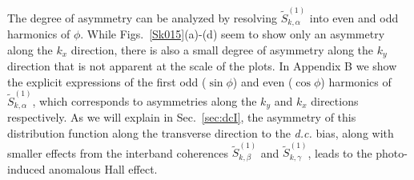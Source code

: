 \documentclass[reprint,amsmath,amssymb,aps,prb]{revtex4-1}
\begin{document}
The degree of asymmetry can be analyzed by resolving $\tilde{S}_{k,\alpha}^{(1)}$ into even and odd harmonics of $\phi$. 
While Figs.~\ref{Sk015}(a)-(d) seem to show only an asymmetry along the $k_x$  direction, there is also a small degree of asymmetry along the $k_y$ direction that is not apparent at the scale of the plots. In Appendix B we show the explicit expressions of the first odd ($\sin\phi$) and even ($\cos\phi$) harmonics of $\tilde{S}_{k,\alpha}^{(1)}$, which corresponds to asymmetries along the $k_y$ and $k_x$ directions respectively. 
As we will explain in Sec.~\ref{sec:dcI}, 
the asymmetry of this distribution function along the transverse direction to the \textit{d.c.} bias, along with smaller effects from the interband coherences $\tilde{S}_{k,\beta}^{(1)}$ and  $\tilde{S}_{k,\gamma}^{(1)}$, leads to the photo-induced anomalous Hall effect.
\end{document}
